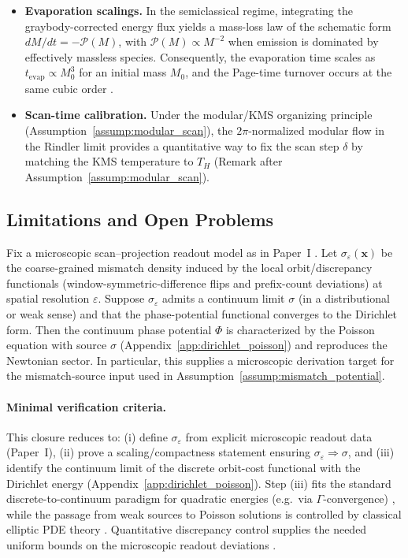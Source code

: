 \begin{itemize}
  \item \textbf{Evaporation scalings.} In the semiclassical regime, integrating the graybody-corrected energy flux yields a mass-loss law of the schematic form $dM/dt=-\mathcal{P}(M)$, with $\mathcal{P}(M)\propto M^{-2}$ when emission is dominated by effectively massless species. Consequently, the evaporation time scales as $t_{\mathrm{evap}}\propto M_0^3$ for an initial mass $M_0$, and the Page-time turnover occurs at the same cubic order \cite{Page1976Emission,Page1993,Wald1994}.
  \item \textbf{Scan-time calibration.} Under the modular/KMS organizing principle (Assumption~\ref{assump:modular_scan}), the $2\pi$-normalized modular flow in the Rindler limit provides a quantitative way to fix the scan step $\delta$ by matching the KMS temperature to $T_H$ (Remark after Assumption~\ref{assump:modular_scan}).
\end{itemize}

\subsection*{Limitations and Open Problems}
\begin{conjecture}
\label{conj:mismatch_poisson}
Fix a microscopic scan--projection readout model as in Paper~I \cite{Ma2025HPA}. Let $\sigma_\varepsilon(\mathbf{x})$ be the coarse-grained mismatch density induced by the local orbit/discrepancy functionals (window-symmetric-difference flips and prefix-count deviations) at spatial resolution $\varepsilon$. Suppose $\sigma_\varepsilon$ admits a continuum limit $\sigma$ (in a distributional or weak sense) and that the phase-potential functional converges to the Dirichlet form. Then the continuum phase potential $\Phi$ is characterized by the Poisson equation with source $\sigma$ (Appendix~\ref{app:dirichlet_poisson}) and reproduces the Newtonian sector. In particular, this supplies a microscopic derivation target for the mismatch-source input used in Assumption~\ref{assump:mismatch_potential}.\par
\end{conjecture}
\paragraph{Minimal verification criteria.}
This closure reduces to: (i) define $\sigma_\varepsilon$ from explicit microscopic readout data (Paper~I), (ii) prove a scaling/compactness statement ensuring $\sigma_\varepsilon\Rightarrow\sigma$, and (iii) identify the continuum limit of the discrete orbit-cost functional with the Dirichlet energy (Appendix~\ref{app:dirichlet_poisson}). Step (iii) fits the standard discrete-to-continuum paradigm for quadratic energies (e.g.\ via $\Gamma$-convergence) \cite{Braides2002Gamma}, while the passage from weak sources to Poisson solutions is controlled by classical elliptic PDE theory \cite{Evans2010PDE}. Quantitative discrepancy control supplies the needed uniform bounds on the microscopic readout deviations \cite{Denjoy1932,Koksma1935,KuipersNiederreiter1974}.

